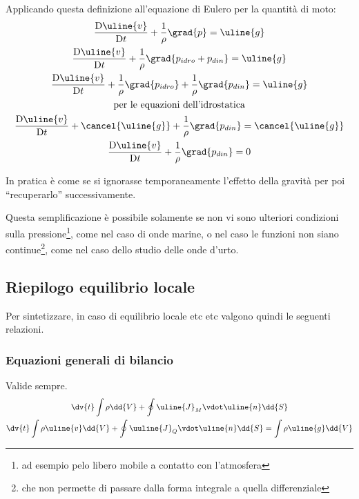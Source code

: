Applicando questa definizione all'equazione di Eulero per la quantità di moto:
%
	\begin{equation*}
		\begin{gathered}
			\frac{\mathrm{D} \uline{v}}{\mathrm{D} t} + \frac{1}{\rho} \grad{p} = \uline{g}\\
			\frac{\mathrm{D} \uline{v}}{\mathrm{D} t} + \frac{1}{\rho} \grad{p_{idro} + p_{din}} = \uline{g}\\
			\frac{\mathrm{D} \uline{v}}{\mathrm{D} t} + \frac{1}{\rho} \grad{p_{idro}} + \frac{1}{\rho} \grad{p_{din}} = \uline{g}\\
			\text{per le equazioni dell'idrostatica}\\
			\frac{\mathrm{D} \uline{v}}{\mathrm{D} t} + \cancel{\uline{g}} + \frac{1}{\rho} \grad{p_{din}} = \cancel{\uline{g}}\\
			\frac{\mathrm{D} \uline{v}}{\mathrm{D} t} + \frac{1}{\rho} \grad{p_{din}} = 0
		\end{gathered}	
	\end{equation*}
%

In pratica è come se si ignorasse temporaneamente l'effetto della gravità per poi ``recuperarlo'' successivamente.

Questa semplificazione è possibile solamente se non vi sono ulteriori condizioni sulla pressione\footnote{ad esempio pelo libero mobile a contatto con l'atmosfera}, come nel caso di onde marine, o nel caso le funzioni non siano continue\footnote{che non permette di passare dalla forma integrale a quella differenziale}, come nel caso dello studio delle onde d'urto.

\subsection{Riepilogo equilibrio locale}
Per sintetizzare, in caso di equilibrio locale etc etc valgono quindi le seguenti relazioni.

\subsubsection{Equazioni generali di bilancio}
Valide sempre.
%
	\begin{equation*}
		\begin{gathered}
			\dv{t} \int \rho \dd{V} + \oint \uline{J}_M \vdot \uline{n} \dd{S}\\
			\dv{t} \int \rho \uline{v} \dd{V} + \oint \uuline{J}_Q \vdot \uline{n} \dd{S} = \int \rho \uline{g} \dd{V}
		\end{gathered}
	\end{equation*}
%
	
